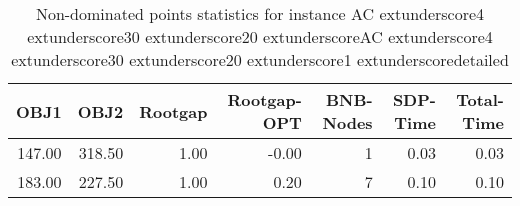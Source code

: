 \begin{table}
\caption{Non-dominated points statistics for instance AC	extunderscore4	extunderscore30	extunderscore20	extunderscoreAC	extunderscore4	extunderscore30	extunderscore20	extunderscore1	extunderscoredetailed}
\label{tab:stats/AC_4_30_20_AC_4_30_20_1_detailed}
\begin{tabular}{rrrrrrr}
\toprule
OBJ1 & OBJ2 & Rootgap & Rootgap-OPT & BNB-Nodes & SDP-Time & Total-Time \\
\midrule
147.00 & 318.50 & 1.00 & -0.00 & 1 & 0.03 & 0.03 \\
183.00 & 227.50 & 1.00 & 0.20 & 7 & 0.10 & 0.10 \\
\bottomrule
\end{tabular}
\end{table}
